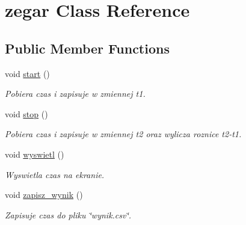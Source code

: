 \hypertarget{classzegar}{\section{zegar \-Class \-Reference}
\label{classzegar}
}
\subsection*{\-Public \-Member \-Functions}
\begin{DoxyCompactItemize}
\item 
\hypertarget{classzegar_a20f54bf635dd6b8fa3729a898dee0b02}{void \hyperlink{classzegar_a20f54bf635dd6b8fa3729a898dee0b02}{start} ()}\label{classzegar_a20f54bf635dd6b8fa3729a898dee0b02}

\begin{DoxyCompactList}\small\item\em \-Pobiera czas i zapisuje w zmiennej t1. \end{DoxyCompactList}\item 
\hypertarget{classzegar_a11470b47ba97baeb33376062c8765e29}{void \hyperlink{classzegar_a11470b47ba97baeb33376062c8765e29}{stop} ()}\label{classzegar_a11470b47ba97baeb33376062c8765e29}

\begin{DoxyCompactList}\small\item\em \-Pobiera czas i zapisuje w zmiennej t2 oraz wylicza roznice t2-\/t1. \end{DoxyCompactList}\item 
\hypertarget{classzegar_adefab1d01ca1e95b6a6cf31c7322f78d}{void \hyperlink{classzegar_adefab1d01ca1e95b6a6cf31c7322f78d}{wyswietl} ()}\label{classzegar_adefab1d01ca1e95b6a6cf31c7322f78d}

\begin{DoxyCompactList}\small\item\em \-Wyswietla czas na ekranie. \end{DoxyCompactList}\item 
\hypertarget{classzegar_af63513dc1f53641aad781ebf8c502c27}{void \hyperlink{classzegar_af63513dc1f53641aad781ebf8c502c27}{zapisz\-\_\-wynik} ()}\label{classzegar_af63513dc1f53641aad781ebf8c502c27}

\begin{DoxyCompactList}\small\item\em \-Zapisuje czas do pliku \char`\"{}wynik.\-csv\char`\"{}. \end{DoxyCompactList}\end{DoxyCompactItemize}

